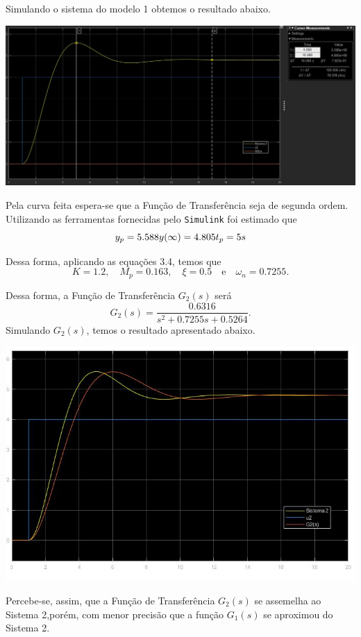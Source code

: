 \documentclass[
]{book}
\theoremstyle{definition}
\theoremstyle{definition}
\theoremstyle{definition}
\theoremstyle{remark}
\begin{document}
Simulando o sistema do modelo 1 obtemos o resultado abaixo.

\includegraphics{Imagens/Lab3/Resolução/prob2A.jpg}

Pela curva feita espera-se que a Função de Transferência seja de segunda ordem. Utilizando as ferramentas fornecidas pelo \texttt{Simulink} foi estimado que
\[
y_p = 5.588 \\  
y(\infty) = 4.805 \\  
t_p = 5s
\]

Dessa forma, aplicando as equações 3.4, temos que
\[
K = 1.2, \quad M_p = 0.163, \quad \xi = 0.5 \quad \text{e} \quad \omega_n = 0.7255.
\]

Dessa forma, a Função de Transferência \(G_2(s)\) será
\[
G_2(s) = \frac {0.6316}{s^2 + 0.7255s + 0.5264}.
\]
Simulando \(G_2(s)\), temos o resultado apresentado abaixo.

\includegraphics{Imagens/Lab3/Resolução/prob2B.jpg}

Percebe-se, assim, que a Função de Transferência \(G_2(s)\) se assemelha ao Sistema 2,porém, com menor precisão que a função \(G_1(s)\) se aproximou do Sistema 2.
\end{document}
